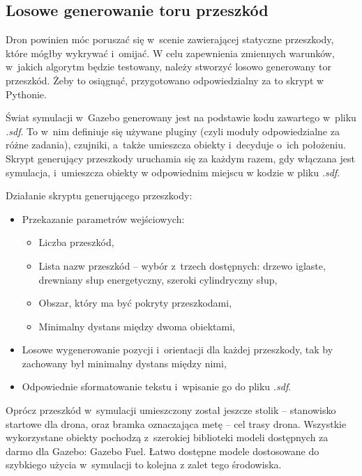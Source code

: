 
\subsection{Losowe generowanie toru przeszkód}
\label{subsec:tor}

Dron powinien móc poruszać się w~scenie zawierającej statyczne przeszkody, które mógłby wykrywać i~omijać. 
W celu zapewnienia zmiennych warunków, w~jakich algorytm będzie testowany, należy stworzyć losowo generowany tor przeszkód. Żeby to osiągnąć, przygotowano odpowiedzialny za to skrypt w Pythonie.

Świat symulacji w~Gazebo generowany jest na podstawie kodu zawartego w~pliku \textit{.sdf}. To w~nim definiuje się używane pluginy (czyli moduły odpowiedzialne za różne zadania), czujniki, a~także umieszcza obiekty i~decyduje o~ich położeniu. Skrypt generujący przeszkody uruchamia się za każdym razem, gdy włączana jest symulacja, i~umieszcza obiekty w odpowiednim miejscu w kodzie w pliku \textit{.sdf}.

\vspace{11px}

Działanie skryptu generującego przeszkody:
\begin{itemize}
    \item Przekazanie parametrów wejściowych:
    \begin{itemize}
        \item Liczba przeszkód,
        \item Lista nazw przeszkód -- wybór z~trzech dostępnych: drzewo iglaste, drewniany słup energetyczny, szeroki cylindryczny słup,
        \item Obszar, który ma być pokryty przeszkodami,
        \item Minimalny dystans między dwoma obiektami,
    \end{itemize}
    \item Losowe wygenerowanie pozycji i~orientacji dla każdej przeszkody, tak by zachowany był minimalny dystans między nimi,
    \item Odpowiednie sformatowanie tekstu i~wpisanie go do pliku \textit{.sdf}.
\end{itemize}

Oprócz przeszkód w~symulacji umieszczony został jeszcze stolik -- stanowisko startowe dla drona, oraz bramka oznaczająca metę -- cel trasy drona.
Wszystkie wykorzystane obiekty pochodzą z~szerokiej biblioteki modeli dostępnych za darmo dla Gazebo: Gazebo Fuel. Łatwo dostępne modele dostosowane do szybkiego użycia w~symulacji to kolejna z zalet tego środowiska.

